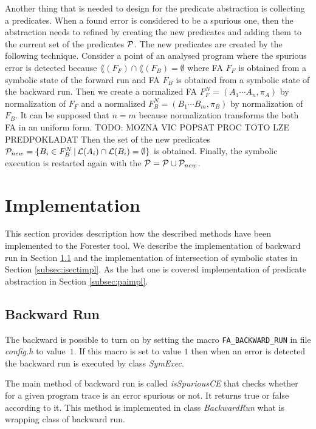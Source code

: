 Another thing that is needed to design for the predicate abstraction is collecting a predicates.
When a found error is considered to be a spurious one, then the abstraction needs to refined
by creating the new predicates and adding them to the current set of the predicates $\mathcal{P}$.
The new predicates are created by the following technique.
Consider a point of an analysed program where the spurious error is detected
because $\lang(F_F) \cap \lang(F_B) = \emptyset$ where FA $F_F$ is obtained
from a symbolic state of the forward run and FA $F_B$ is obtained from a symbolic state of
the backward run.
Then we create a normalized FA $F_F^N = (A_1 \cdots A_n, \pi_A)$ by normalization of $F_F$
and a normalized $F_B^N = (B_1 \cdots B_m, \pi_B)$ by normalization of $F_B$.
It can be supposed that $n = m$ because normalization transforms the both FA in an uniform form.
TODO: MOZNA VIC POPSAT PROC TOTO LZE PREDPOKLADAT
Then the set of the new predicates $\mathcal{P}_{new} = \{B_i \in F^N_B \,|\, \mathcal{L}(A_i) \cap \mathcal{L}(B_i) =
\emptyset\}$ is obtained.
Finally, the symbolic execution is restarted again with the $\mathcal{P} = \mathcal{P} \cup \mathcal{P}_{new}$.

\section{Implementation}
\label{sec:impl}

This section provides description how the described methods have been implemented
to the Forester tool.
We describe the implementation of backward run in Section \ref{subsec:bwimpl}
and the implementation of intersection of symbolic states in Section \ref{subsec:isectimpl}.
As the last one is covered implementation of predicate abstraction in Section \ref{subsec:paimpl}.

\subsection{Backward Run}
\label{subsec:bwimpl}

The backward is possible to turn on by setting the macro {\tt FA\_BACKWARD\_RUN}
in file \emph{config.h} to value~$1$.
If this macro is set to value $1$ then when an error is detected 
the backward run is executed by class \emph{SymExec}.

The main method of backward run is called \emph{isSpuriousCE} that
checks whether for a given program trace is an error
spurious or not.
It returns true or false according to it.
This method is implemented in class \emph{BackwardRun} what is wrapping
class of backward run.

